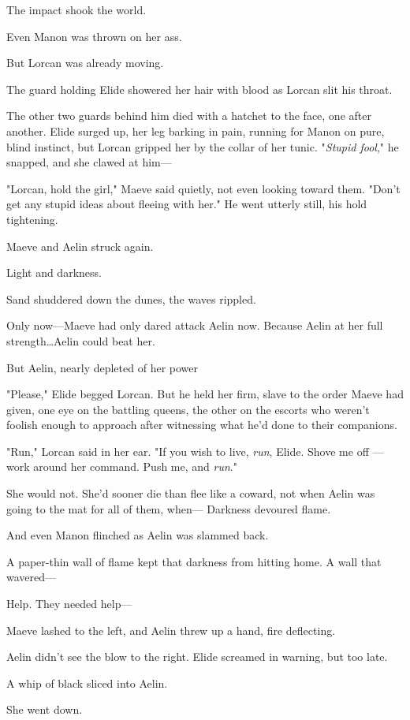 The impact shook the world.

Even Manon was thrown on her ass.

But Lorcan was already moving.

The guard holding Elide showered her hair with blood as Lorcan slit his throat.

The other two guards behind him died with a hatchet to the face, one after another.
Elide surged up, her leg barking in pain, running for Manon on pure, blind instinct, but Lorcan gripped her by the collar of her tunic.
"\emph{Stupid fool}," he snapped, and she clawed at him---

"Lorcan, hold the girl," Maeve said quietly, not even looking toward them.
"Don't get any stupid ideas about fleeing with her."
He went utterly still, his hold tightening.

Maeve and Aelin struck again.

Light and darkness.

Sand shuddered down the dunes, the waves rippled.

Only now---Maeve had only dared attack Aelin now.
Because Aelin at her full strength\ldots Aelin could beat her.

But Aelin, nearly depleted of her power 

"Please," Elide begged Lorcan.
But he held her firm, slave to the order Maeve had given, one eye on the battling queens, the other on the escorts who weren't foolish enough to approach after witnessing what he'd done to their companions.

"Run," Lorcan said in her ear.
"If you wish to live, \emph{run}, Elide.
Shove me off ---work around her command.
Push me, and \emph{run}."

She would not.
She'd sooner die than flee like a coward, not when Aelin was going to the mat for all of them, when--- Darkness devoured flame.

And even Manon flinched as Aelin was slammed back.

A paper-thin wall of flame kept that darkness from hitting home.
A wall that wavered---

Help.
They needed help---

Maeve lashed to the left, and Aelin threw up a hand, fire deflecting.

Aelin didn't see the blow to the right.
Elide screamed in warning, but too late.

A whip of black sliced into Aelin.

She went down.

